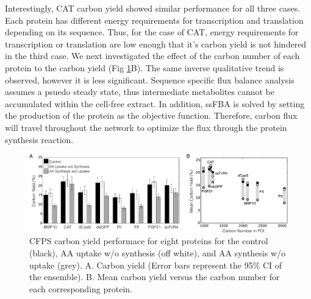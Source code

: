 \documentclass[journal=asbcd6,manuscript=article]{achemso}
\begin{document}
Interestingly, CAT carbon yield showed similar performance for all three cases.
Each protein has different energy requirements for transcription and translation depending on its sequence.
Thus, for the case of CAT, energy requirements for transcription or translation are low enough that it's carbon yield is not hindered in the third case.
We next investigated the effect of the carbon number of each protein to the carbon yield (Fig \ref{fig:Yield_POI}B).
The same inverse qualitative trend is observed, however it is less significant.
Sequence specific flux balance analysis assumes a psuedo steady state, thus intermediate metabolites cannot be accumulated within the cell-free extract.
In addition, ssFBA is solved by setting the production of the protein as the objective function.
Therefore, carbon flux will travel throughout the network to optimize the flux through the protein synthesis reaction.
\begin{figure}[t!]
\centering
\includegraphics[width=1.00\textwidth]{./Figures/Yield_POI.pdf}
\caption{CFPS carbon yield performace for eight proteins for the control (black), AA uptake w/o synthesis (off white), and AA synthesis w/o uptake (grey). A. Carbon yield (Error bars represent the 95\% CI of the ensemble). B. Mean carbon yield versus the carbon number for each corresponding protein.}
\label{fig:Yield_POI}
\end{figure}
\end{document}
